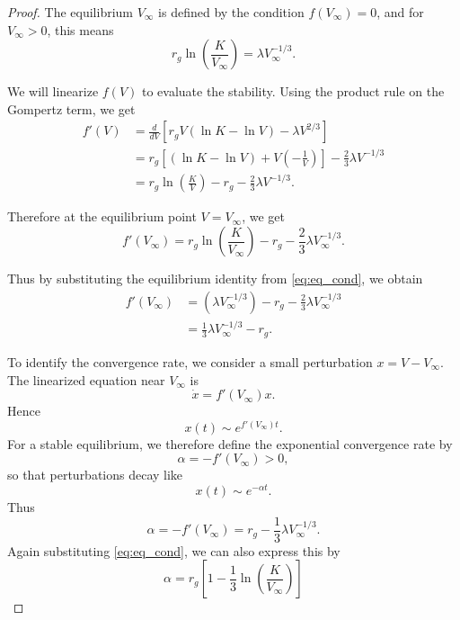 \documentclass[11pt, reqno]{amsart}
\numberwithin{equation}{section}
\theoremstyle{definition}
\begin{document}
\begin{proof}
The equilibrium $V_{\infty}$ is defined by the condition $f(V_{\infty}) = 0$, and for $V_{\infty} > 0$, this means
\begin{equation}\label{eq:eq_cond}
r_{g} \ln\left(\frac{K}{V_{\infty}}\right) = \lambda V_{\infty}^{-1/3}.
\end{equation}

We will linearize $f(V)$ to evaluate the stability. Using the product rule on the Gompertz term, we get
\begin{align*}
f'(V) &= \frac{d}{dV} \left[ r_{g} V (\ln K - \ln V) - \lambda V^{2/3} \right] \\
&= r_{g} \left[ (\ln K - \ln V) + V \left( -\frac{1}{V} \right) \right] - \frac{2}{3} \lambda V^{-1/3} \\
&= r_{g} \ln \left( \frac{K}{V} \right) - r_{g} - \frac{2}{3} \lambda V^{-1/3}.
\end{align*}

Therefore at the equilibrium point $V = V_{\infty}$, we get
\begin{equation*}
f'(V_{\infty}) = r_{g} \ln \left( \frac{K}{V_{\infty}} \right) - r_{g} - \frac{2}{3} \lambda V_{\infty}^{-1/3}.
\end{equation*}

Thus by substituting the equilibrium identity from \eqref{eq:eq_cond}, we obtain
\begin{align*}
f'(V_{\infty}) &= \left( \lambda V_{\infty}^{-1/3} \right) - r_{g} - \frac{2}{3} \lambda V_{\infty}^{-1/3} \\
&= \frac{1}{3} \lambda V_{\infty}^{-1/3} - r_{g}.
\end{align*}

To identify the convergence rate, we consider a small perturbation $x=V-V_\infty$. The linearized equation near $V_\infty$ is
\[
\dot x=f'(V_\infty)x.
\]
Hence
\[
x(t)\sim e^{f'(V_\infty)t}.
\]
For a stable equilibrium, we therefore define the exponential convergence rate by
\[
\alpha=-f'(V_\infty)>0,
\]
so that perturbations decay like
\[
x(t)\sim e^{-\alpha t}.
\]
Thus
\begin{equation}
\alpha = -f'(V_\infty)= r_{g} - \frac{1}{3} \lambda V_{\infty}^{-1/3}.
\end{equation}
Again substituting \eqref{eq:eq_cond}, we can also express this by
\begin{equation}
\alpha = r_{g} \left[ 1 - \frac{1}{3} \ln \left( \frac{K}{V_{\infty}} \right) \right]
\end{equation}
\end{proof}
\end{document}

